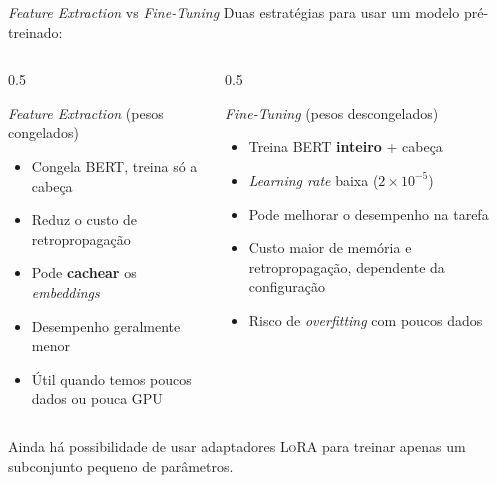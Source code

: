 \documentclass[aspectratio=169, xcolor=dvipsnames]{beamer}
\begin{document}
  \begin{frame}{\textit{Feature Extraction} vs \textit{Fine-Tuning}}
    Duas estratégias para usar um modelo pré-treinado:
    \vspace{0.3em}
    \begin{columns}[T]
      \begin{column}{0.5\textwidth}
        \begin{block}{\textit{Feature Extraction} (pesos congelados)}
          \begin{itemize}
            \item Congela BERT, treina só a cabeça
            \item Reduz o custo de retropropagação
            \item Pode \textbf{cachear} os \textit{embeddings}
            \item Desempenho geralmente menor
            \item Útil quando temos poucos dados ou pouca GPU
          \end{itemize}
        \end{block}
      \end{column}
      \begin{column}{0.5\textwidth}
        \begin{block}{\textit{Fine-Tuning} (pesos descongelados)}
          \begin{itemize}
            \item Treina BERT \textbf{inteiro} + cabeça
            \item \textit{Learning rate} baixa ($2\times10^{-5}$)
            \item Pode melhorar o desempenho na tarefa
            \item Custo maior de memória e retropropagação, dependente da configuração
            \item Risco de \textit{overfitting} com poucos dados
          \end{itemize}
        \end{block}
      \end{column}
    \end{columns}
    \vspace{0.3em}
    Ainda há possibilidade de usar adaptadores \textsc{LoRA} para treinar apenas um subconjunto pequeno de parâmetros.
  \end{frame}
\end{document}
